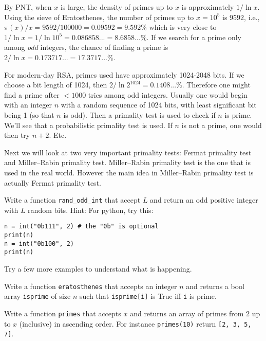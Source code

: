 By PNT, when $x$ is large, the density of primes up to $x$ is approximately
$1/\ln x$.
Using the sieve of Eratosthenes, the number of primes up to $x = 10^5$ is
$9592$, i.e., $\pi(x)/x = 9592/100000 = 0.09592 = 9.592\%$
which is very close to $1/\ln x = 1/\ln 10^5 = 0.086858... = 8.6858...\%$.
If we search for a prime only among \textit{odd} integers, the
chance of finding a prime is $2/\ln x = 0.173717... = 17.3717...\%$.

For modern-day RSA, primes used have approximately 1024-2048 bits.
If we choose a bit length of 1024, then
$2/\ln 2^{1024} = 0.1408...\%$.
Therefore one might find a prime after $< 1000$ tries among odd integers.
Usually one would begin with an integer $n$
with a random sequence of 1024 bits, with least
significant bit being 1 (so that $n$ is odd).
Then a primality test is used to check if $n$ is prime.
We'll see that a probabilistic primality test is used.
If $n$ is not a prime, one would then try $n + 2$. Etc.

Next we will look at two very important primality tests: Fermat primality test
and Miller--Rabin primality test.
Miller--Rabin primality test is the one that is used in the real world.
However the main idea in Miller--Rabin primality test is
actually Fermat primality test.

\begin{ex}
  Write a function \verb!rand_odd_int! that accept $L$ and return an odd
  positive integer with $L$ random bits.
  Hint: For python, try this:
  \begin{Verbatim}[frame=single,fontsize=\footnotesize]
n = int("0b111", 2) # the "0b" is optional
print(n)
n = int("0b100", 2)    
print(n)
  \end{Verbatim}
  Try a few more examples to understand what is happening.
\end{ex}

\begin{ex}
  Write a function \verb!eratosthenes! that accepts an integer $n$
  and returns a bool array \verb!isprime! of size $n$ such that
  \verb!isprime[i]! is True iff \verb!i! is prime.
\end{ex}

\begin{ex}
  Write a function \verb!primes! that accepts $x$
  and returns an array of primes from $2$ up to $x$ (inclusive) in
  ascending order.
  For instance \verb!primes(10)! return \verb![2, 3, 5, 7]!.
\end{ex}

